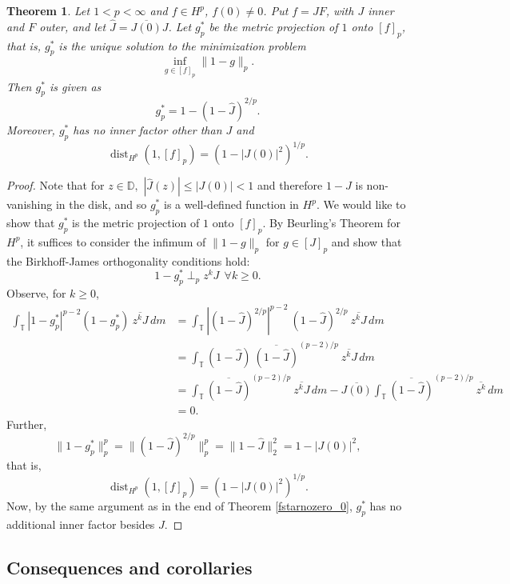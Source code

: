 \documentclass{article}
\theoremstyle{plain}
\newtheorem{Theorem}{Theorem}
\numberwithin{Theorem}{section}
\numberwithin{equation}{section}
\theoremstyle{plain}
\theoremstyle{definition}
\renewcommand{\leq}{\leqslant}
\newcommand{\D}{\mathbb{D}}
\newcommand{\T}{\mathbb{T}}
\begin{document}



\begin{Theorem}\label{s_and_s}
Let $1 < p < \infty$ and $f \in H^p$, $f(0) \neq 0$. Put $f = J F$, with $J$ inner and $F$ outer, and let $\hat{J} = \overline{J(0)}J$. Let  $g_p^*$ be the metric projection of $1$ onto $[f]_p$, that is, $g_p^*$ is the unique solution to the minimization problem 
\[
\inf_{g \in [f]_p} \| 1 - g \|_p.
\]
Then $g_p^*$ is given as
\[
g_p^* = 1 - (1 - \hat{J})^{2/p}.
\]
Moreover, $g_p^*$ has no inner factor other than $J$ and
\[
\operatorname{dist}_{H^p}(1, [f]_p) = (1 - |J(0)|^2)^{1/p}. 
\]
\end{Theorem}

\begin{proof}
Note that for $z \in \D,$  $|\hat{J}(z)| \leq |J(0)| < 1 $ and therefore $1 - \hat{J}$ is non-vanishing in the disk, and so $g_p^*$ is a well-defined function in $H^p$.  We would like to show that $g_p^*$ is the metric projection of $1$ onto $[f]_p$. 
By Beurling's Theorem for $H^p$, it suffices to consider the infimum of $\|1 - g\|_p$ for $g \in [J]_p$ and show that the Birkhoff-James orthogonality conditions hold:
\[
1 - g_p^* \perp_p z^k J \ \  \forall k \ge 0.
\]
Observe, for $k \ge 0$, 
\begin{align*}
\int_\T\left| 1 - g_p^* \right|^{p-2} (1 - g_p^*)\ \overline{z^kJ} \,dm
&= \int_\T \left| (1 - \hat{J})^{2/p} \right|^{p-2} \ (1 - \hat{J})^{2/p} \ \overline{z^kJ} \,dm\\
&= \int_\T (1 - \hat{J}) \  \overline{(1 - \hat{J})}^{(p-2)/p} \ \overline{z^kJ} \,dm\\
&= \int_\T \overline{(1 - \hat{J})}^{(p-2)/p} \ \overline{z^kJ}\,dm - \overline{J(0)}\int_\T \overline{(1 - \hat{J})}^{(p-2)/p} \ \overline{z^k} \,dm\\
&= 0.
\end{align*}
Further, 
\[
\| 1 - g_p^* \|_p^p =\| (1 - \hat{J})^{2/p}\|_p^p = \| 1-  \hat{J}\|_2^2 = 1 - |J(0)|^2,
\]
 that is, 
\[
\operatorname{dist}_{H^p}(1, [f]_p) = (1 - |J(0)|^2)^{1/p}. 
\]
Now, by the same argument as in the end of Theorem \ref{fstarnozero_0}, $g_p^*$ has no additional inner factor besides $J$.
\end{proof}

\subsection{Consequences and corollaries}
\end{document}
